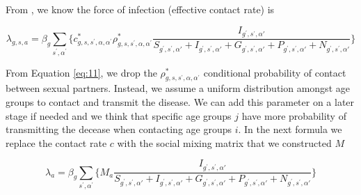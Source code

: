 \documentclass[12pt]{article}
\begin{document}
From \cite[p.9]{Gareth:2013}, we know the force of infection (effective contact rate) is

\begin{equation}
\lambda_{g,s,a}=\beta_{g}\sum_{s^{'}, \alpha^{'}} \bigg\{ c^{*}_{g,s,s^{'},\alpha,\alpha^{'}} \rho^{*}_{g,s,s^{'},\alpha,\alpha^{'}} \frac{I_{g^{'}, s^{'}, \alpha{'}}}{S_{g^{'}, s^{'}, \alpha{'}} + I_{g^{'}, s^{'}, \alpha{'}} + G_{g^{'}, s^{'}, \alpha{'}} + P_{g^{'}, s^{'}, \alpha{'}} + N_{g^{'}, s^{'}, \alpha{'}} } \bigg\}
\label{eq:11}
\end{equation}

From Equation \ref{eq:11}, we drop the $\rho^{*}_{g,s,s^{'},\alpha,\alpha^{'}}$ conditional probability of contact between sexual partners. Instead, we assume a uniform distribution amongst age groups to contact and transmit the disease. We can add this parameter on a later stage if needed and we think that specific age groups $j$ have more probability of transmitting the decease when contacting age groups $i$. In the next formula we replace the contact rate $c$ with the social mixing matrix that we constructed $M$

\begin{equation}
\lambda_{a}=\beta_{g}\sum_{s^{'}, \alpha^{'}} \bigg\{ M_{a} \frac{I_{g^{'}, s^{'}, \alpha{'}}}{S_{g^{'}, s^{'}, \alpha{'}} + I_{g^{'}, s^{'}, \alpha{'}} + G_{g^{'}, s^{'}, \alpha{'}} + P_{g^{'}, s^{'}, \alpha{'}} + N_{g^{'}, s^{'}, \alpha{'}} } \bigg\}
\label{eq:11}
\end{equation}



\end{document}
